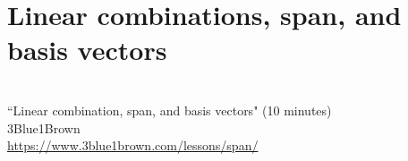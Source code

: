 \section{Linear combinations, span, and basis vectors}
\begin{bookfigure}
   \\
  ``Linear combination, span, and basis vectors" (10 minutes) \\
  \footnotesize 3Blue1Brown \\
  \url{https://www.3blue1brown.com/lessons/span/}
\end{bookfigure}
